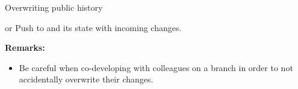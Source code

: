 \begin{frame}{Overwriting public history}
\begin{block}{ or }
Push to  and  its state with incoming changes.
\end{block}
\textbf{Remarks:}
\begin{itemize}
\item Be careful when co-developing with colleagues on a branch in order to not accidentally overwrite their changes.
\end{itemize}
\end{frame}

%


